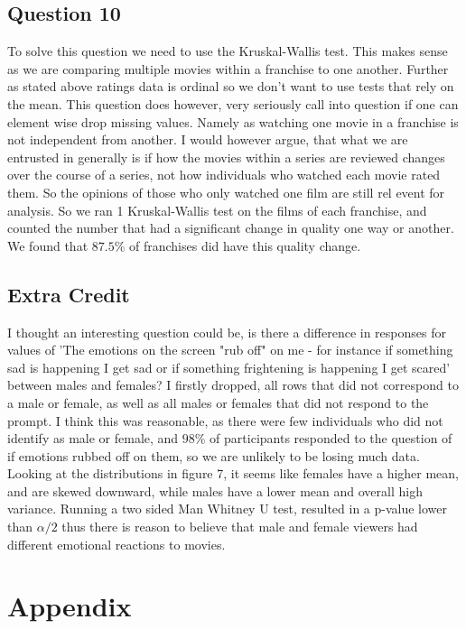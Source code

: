 \documentclass{article}
\begin{document}
\subsection*{Question 10}
To solve this question we need to use the Kruskal-Wallis test. This makes sense as we are comparing multiple movies within a franchise to one another. Further as stated above ratings data is ordinal so we don't want to use tests that rely on the mean. This question does however, very seriously call into question if one can element wise drop missing values. Namely as watching one movie in a franchise is not independent from another. I would however argue, that what we are entrusted in generally is if how the movies within a series are reviewed changes over the course of a series, not how individuals who watched each movie rated them. So the opinions of those who only watched one film are still rel event for analysis. So we ran 1 Kruskal-Wallis test on the films of each franchise, and counted the number that had a significant change in quality one way or another. We found that $87.5\%$ of franchises did have this quality change. 

\subsection*{Extra Credit}
I thought an interesting question could be, is there a difference in responses for values of 'The emotions on the screen "rub off" on me - for instance if something sad is happening I get sad or if something frightening is happening I get scared' between males and females? I firstly dropped, all rows that did not correspond to a male or female, as well as all males or females that did not respond to the prompt. I think this was reasonable, as there were few individuals who did not identify as male or female, and $98\%$ of participants responded to the question of if emotions rubbed off on them, so we are unlikely to be losing much data. Looking at the distributions in figure 7, it seems like females have a higher mean, and are skewed downward, while males have a lower mean and overall high variance.  Running a two sided Man Whitney U test, resulted in a p-value lower than $\alpha/2$ thus there is reason to believe that male and female viewers had different emotional reactions to movies.  


\newpage\section*{Appendix}
\end{document}
